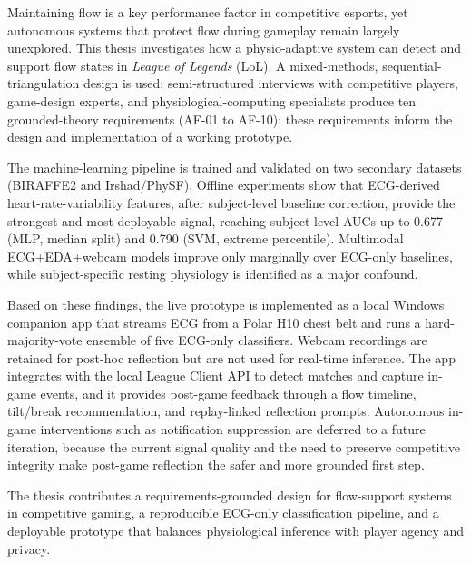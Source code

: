 Maintaining flow is a key performance factor in competitive esports, yet autonomous systems that protect flow during gameplay remain largely unexplored. This thesis investigates how a physio-adaptive system can detect and support flow states in \textit{League of Legends} (LoL). A mixed-methods, sequential-triangulation design is used: semi-structured interviews with competitive players, game-design experts, and physiological-computing specialists produce ten grounded-theory requirements (AF-01 to AF-10); these requirements inform the design and implementation of a working prototype.

The machine-learning pipeline is trained and validated on two secondary datasets (BIRAFFE2 and Irshad/PhySF). Offline experiments show that ECG-derived heart-rate-variability features, after subject-level baseline correction, provide the strongest and most deployable signal, reaching subject-level AUCs up to 0.677 (MLP, median split) and 0.790 (SVM, extreme percentile). Multimodal ECG+EDA+webcam models improve only marginally over ECG-only baselines, while subject-specific resting physiology is identified as a major confound.

Based on these findings, the live prototype is implemented as a local Windows companion app that streams ECG from a Polar H10 chest belt and runs a hard-majority-vote ensemble of five ECG-only classifiers. Webcam recordings are retained for post-hoc reflection but are not used for real-time inference. The app integrates with the local League Client API to detect matches and capture in-game events, and it provides post-game feedback through a flow timeline, tilt/break recommendation, and replay-linked reflection prompts. Autonomous in-game interventions such as notification suppression are deferred to a future iteration, because the current signal quality and the need to preserve competitive integrity make post-game reflection the safer and more grounded first step.

The thesis contributes a requirements-grounded design for flow-support systems in competitive gaming, a reproducible ECG-only classification pipeline, and a deployable prototype that balances physiological inference with player agency and privacy.
